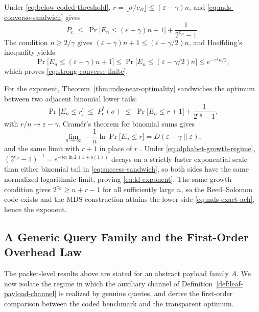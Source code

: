 \documentclass[journal]{IEEEtran}
\makeatletter
\numberwithin{equation}{section}
\renewenvironment{proof}[1][\proofname]{\par
  \pushQED{\qed}%
  \normalfont \topsep6\p@\@plus6\p@\relax
  \trivlist
  \item[\hskip\labelsep
        \itshape
    #1\@addpunct{.}]\ignorespaces
}{%
  \popQED\endtrivlist\@endpefalse
}
\makeatother
\begin{document}
\begin{proof}
Under \eqref{eq:below-coded-threshold},
\(r=\lfloor\sigma/c_B\rfloor\le(\varepsilon-\gamma)n\), and
\eqref{eq:mds-converse-sandwich} gives
\[
  P_{\mathrm c}
  \;\le\;
  \Pr\!\bigl[E_n\le(\varepsilon-\gamma)n+1\bigr]
  +
  \frac{1}{2^{c_B}-1}.
\]
The condition \(n\ge 2/\gamma\) gives
\((\varepsilon-\gamma)n+1\le(\varepsilon-\gamma/2)n\), and Hoeffding's
inequality \cite{hoeffding1963probability} yields
\[
  \Pr\bigl[E_n\!\le\!(\varepsilon-\gamma)n+1\bigr]
  \!\le\!
  \Pr\bigl[E_n\!\le\!(\varepsilon-\gamma/2)n\bigr]
  \!\le\!
  e^{-\gamma^{2}n/2},
\]
which proves \eqref{eq:strong-converse-finite}.

For the exponent, Theorem~\ref{thm:mds-near-optimality} sandwiches the
optimum between two adjacent binomial lower tails:
\begin{equation}
  \Pr\!\bigl[E_n\le r\bigr]
  \;\le\;
  P_{\mathrm c}^{*}(\sigma)
  \;\le\;
  \Pr\!\bigl[E_n\le r+1\bigr]
  +
  \frac{1}{2^{c_B}-1},
\label{eq:success-sandwich}
\end{equation}
with \(r/n\to\varepsilon-\gamma\).  Cram\'er's theorem for binomial sums
gives
\[
  \lim_{n\to\infty}
  -\frac{1}{n}\ln
  \Pr\!\bigl[E_n\le r\bigr]
  =
  D(\varepsilon-\gamma\|\varepsilon),
\]
and the same limit with \(r+1\) in place of \(r\)
\cite[Theorem~2.2.3]{dembo2009large}.  Under \eqref{eq:alphabet-growth-regime},
\((2^{c_B}-1)^{-1}=e^{-\nu n\ln 2\,(1+o(1))}\) decays on a strictly faster
exponential scale than either binomial tail in \eqref{eq:success-sandwich},
so both sides have the same normalized logarithmic limit, proving
\eqref{eq:kl-exponent}.  The same growth condition gives
\(2^{c_B}\ge n+r-1\) for all sufficiently large \(n\), so the Reed--Solomon
code exists and the MDS construction attains the lower side
\eqref{eq:mds-exact-ach}, hence the exponent.
\end{proof}

\subsection{A Generic Query Family and the First-Order Overhead Law}
\label{subsec:generic-first-order}

The packet-level results above are stated for an abstract payload family
\(A\).  We now isolate the regime in which the auxiliary channel of
Definition~\ref{def:leaf-payload-channel} is realized by genuine queries,
and derive the first-order comparison between the coded benchmark and the
transparent optimum.
\end{document}
